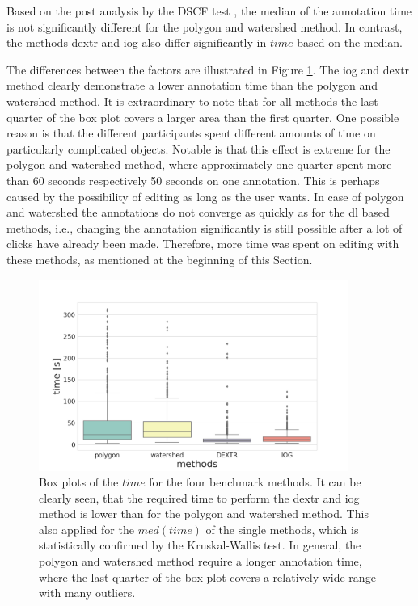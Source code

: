Based on the post analysis by the DSCF test \cite{CF91-dscf}, the median of the annotation time is not significantly different for the polygon and watershed method.
In contrast, the methods \gls{dextr} and \gls{iog} also differ significantly in $ time $ based on the median.

The differences between the factors are illustrated in Figure \ref{fig:ch5:sec1:time_box_plot}.
The \gls{iog} and \gls{dextr} method clearly demonstrate a lower annotation time than the polygon and watershed method.
It is extraordinary to note that for all methods the last quarter of the box plot covers a larger area than the first quarter.
One possible reason is that the different participants spent different amounts of time on particularly complicated objects.
Notable is that this effect is extreme for the polygon and watershed method, where approximately one quarter spent more than 60 seconds respectively 50 seconds on one annotation. 
This is perhaps caused by the possibility of editing as long as the user wants. 
In case of polygon and watershed the annotations do not converge as quickly as for the \gls{dl} based methods, i.e., changing the annotation significantly is still possible after a lot of clicks have already been made.
Therefore, more time was spent on editing with these methods, as mentioned at the beginning of this Section.

\begin{figure}
	\centering
	\includegraphics[width=0.9\textwidth]{figures/chap51_time_boxplot.png}
	\caption[Box plots of the methods on $ IoU  $]{
		Box plots of the $ time $ for the four benchmark methods.
		It can be clearly seen, that the required time to perform the \gls{dextr} and \gls{iog} method is lower than for the polygon and watershed method.
		This also applied for the $ med \left( time \right) $ of the single methods, which is statistically confirmed by the Kruskal-Wallis test.
		In general, the polygon and watershed method require a longer annotation time, where the last quarter of the box plot covers a relatively wide range with many outliers. 
	} \label{fig:ch5:sec1:time_box_plot}
\end{figure}


